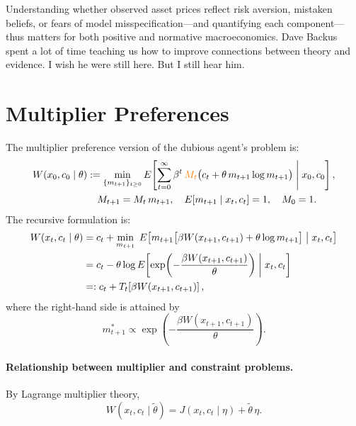 \documentclass[12pt]{article}
\theoremstyle{definition}
\begin{document}
Understanding whether observed asset prices reflect risk aversion,
mistaken beliefs, or fears of model misspecification---and quantifying
each component--- thus matters for both positive and normative
macroeconomics. Dave Backus spent a lot of time teaching us how to  improve connections  between theory and evidence. I wish he were still here. But  I  still hear him.


\appendix
\section{Multiplier Preferences}
\label{sec:multiplier}

The multiplier preference version of the dubious agent's problem is:
\begin{align}
W(x_0, c_0 \mid \theta) &:= \min_{\{m_{t+1}\}_{t\geq 0}}
    E\!\left[\sum_{t=0}^{\infty} \beta^t\,
    {\color{orange} M_t}\bigl(c_t + \theta\, m_{t+1}\log m_{t+1}\bigr)
    \;\middle|\; x_0, c_0\right], \label{eq:mult-seq}\\
&\quad M_{t+1} = M_t\, m_{t+1},\quad
    E[m_{t+1} \mid x_t, c_t] = 1,\quad M_0 = 1. \notag
\end{align}
The recursive formulation is:
\begin{align}
W(x_t, c_t \mid \theta) &= c_t + \min_{m_{t+1}}\;
    E\!\left[m_{t+1}\bigl[\beta W(x_{t+1}, c_{t+1})
    + \theta\log m_{t+1}\bigr] \;\middle|\; x_t, c_t\right] \notag\\
&= c_t - \theta\log E\!\left[\exp\!\left(
    -\frac{\beta W(x_{t+1}, c_{t+1})}{\theta}\right)
    \;\middle|\; x_t, c_t\right] \notag\\
&=: c_t + T_t\!\left[\beta W(x_{t+1}, c_{t+1})\right], \label{eq:mult-bellman}
\end{align}
where the right-hand side is attained by
\[
   m_{t+1}^* \propto \exp\!\left(
       -\frac{\beta W(x_{t+1}, c_{t+1})}{\theta}\right).
\]

\paragraph{Relationship between multiplier and constraint problems.}
By Lagrange multiplier theory,
\[
   W(x_t, c_t \mid \tilde\theta) = J(x_t, c_t \mid \eta)
       + \tilde\theta\, \eta.
\]




\end{document}
